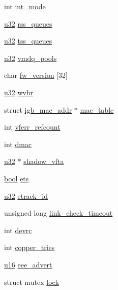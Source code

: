 \begin{DoxyCompactItemize}
\item 
int \hyperlink{structigb__adapter_aae097d90508f127067d914fe2e92a28d}{int\+\_\+mode}
\item 
\hyperlink{lib_2igb_2e1000__osdep_8h_a64e91c10a0d8fb627e92932050284264}{u32} \hyperlink{structigb__adapter_a1c0a0a414a9247a24714575a6c93f9b0}{rss\+\_\+queues}
\item 
\hyperlink{lib_2igb_2e1000__osdep_8h_a64e91c10a0d8fb627e92932050284264}{u32} \hyperlink{structigb__adapter_ac371dbd0d19f7dbef43358d84575729d}{tss\+\_\+queues}
\item 
\hyperlink{lib_2igb_2e1000__osdep_8h_a64e91c10a0d8fb627e92932050284264}{u32} \hyperlink{structigb__adapter_a060f1655e3aa667407ed63d23adbbe5d}{vmdq\+\_\+pools}
\item 
char \hyperlink{structigb__adapter_a0c0348cd3d20dead23c571d91ca11a8f}{fw\+\_\+version} \mbox{[}32\mbox{]}
\item 
\hyperlink{lib_2igb_2e1000__osdep_8h_a64e91c10a0d8fb627e92932050284264}{u32} \hyperlink{structigb__adapter_ac18b7024db900539f8c5f4496956a511}{wvbr}
\item 
struct \hyperlink{structigb__mac__addr}{igb\+\_\+mac\+\_\+addr} $\ast$ \hyperlink{structigb__adapter_a4b3341ed630595db4fc04aed2927d2fe}{mac\+\_\+table}
\item 
int \hyperlink{structigb__adapter_abc9033e3e4f6d93e0e3404cd8d776d3d}{vferr\+\_\+refcount}
\item 
int \hyperlink{structigb__adapter_ac21b4c93238d5fcc3fff9702dfd9eda3}{dmac}
\item 
\hyperlink{lib_2igb_2e1000__osdep_8h_a64e91c10a0d8fb627e92932050284264}{u32} $\ast$ \hyperlink{structigb__adapter_aa7c8f797024e977910661594807f2c23}{shadow\+\_\+vfta}
\item 
\hyperlink{avb__gptp_8h_af6a258d8f3ee5206d682d799316314b1}{bool} \hyperlink{structigb__adapter_a3bc8f190a1e1a1b9e800e08506228d80}{ets}
\item 
\hyperlink{lib_2igb_2e1000__osdep_8h_a64e91c10a0d8fb627e92932050284264}{u32} \hyperlink{structigb__adapter_a9025df95cb081ea9caf184460b72fd62}{etrack\+\_\+id}
\item 
unsigned long \hyperlink{structigb__adapter_a254e631806307426cd9ce65dd92216db}{link\+\_\+check\+\_\+timeout}
\item 
int \hyperlink{structigb__adapter_ac0a0e7f06e849ba5ec750468922e2cdd}{devrc}
\item 
int \hyperlink{structigb__adapter_a3dbb691216c560668ca8304f557c8f88}{copper\+\_\+tries}
\item 
\hyperlink{lib_2igb_2e1000__osdep_8h_acdc9cf0314be0ae5a01d6d4379a95edd}{u16} \hyperlink{structigb__adapter_a2792341c9e7952578b25d76bedd9a5e4}{eee\+\_\+advert}
\item 
struct mutex \hyperlink{structigb__adapter_af635d65f26e31c345ef21c333feb3910}{lock}
\end{DoxyCompactItemize}


